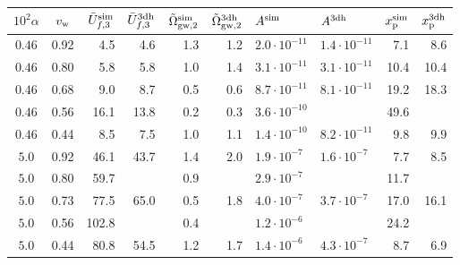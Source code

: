 \begin{tabular}{cc | rr | rr | ll | rr}
\hline\hline
$10^2\alpha$ & $v_{\rm w}$ & $\bar{U}_{f,3}^{\rm sim}$ & $\bar{U}_{f,3}^{\rm 3dh}$ & $\tilde\Omega_{\rm gw,2}^{\rm sim}$ & $\tilde\Omega_{\rm gw,2}^{\rm 3dh}$ & \hspace{1em} $A^{\rm sim}$ & \hspace{1em} $A^{\rm 3dh}$ & $x_{\rm p}^{\rm sim}$ & $x_{\rm p}^{\rm 3dh}$ \\
\hline
$ 0.46 $ & 0.92 &  4.5 &  4.6 & 1.3 & 1.2 & $ 2.0\cdot 10^{-11} $ & $ 1.4\cdot 10^{-11} $ &  7.1 &  8.6 \\
$ 0.46 $ & 0.80 &  5.8 &  5.8 & 1.0 & 1.4 & $ 3.1\cdot 10^{-11} $ & $ 3.1\cdot 10^{-11} $ & 10.4 & 10.4 \\
$ 0.46 $ & 0.68 &  9.0 &  8.7 & 0.5 & 0.6 & $ 8.7\cdot 10^{-11} $ & $ 8.1\cdot 10^{-11} $ & 19.2 & 18.3 \\
$ 0.46 $ & 0.56 & 16.1 & 13.8 & 0.2 & 0.3 & $ 3.6\cdot 10^{-10} $ &          & 49.6 &      \\
$ 0.46 $ & 0.44 &  8.5 &  7.5 & 1.0 & 1.1 & $ 1.4\cdot 10^{-10} $ & $ 8.2\cdot 10^{-11} $ &  9.8 &  9.9 \\
$ 5.0 $ & 0.92 & 46.1 & 43.7 & 1.4 & 2.0 & $ 1.9\cdot 10^{-7} $ & $ 1.6\cdot 10^{-7} $ &  7.7 &  8.5 \\
$ 5.0 $ & 0.80 & 59.7 &      & 0.9 &     & $ 2.9\cdot 10^{-7} $ &          & 11.7 &      \\
$ 5.0 $ & 0.73 & 77.5 & 65.0 & 0.5 & 1.8 & $ 4.0\cdot 10^{-7} $ & $ 3.7\cdot 10^{-7} $ & 17.0 & 16.1 \\
$ 5.0 $ & 0.56 & 102.8 &      & 0.4 &     & $ 1.2\cdot 10^{-6} $ &          & 24.2 &      \\
$ 5.0 $ & 0.44 & 80.8 & 54.5 & 1.2 & 1.7 & $ 1.4\cdot 10^{-6} $ & $ 4.3\cdot 10^{-7} $ &  8.7 &  6.9 \\
\hline\hline
\end{tabular}
